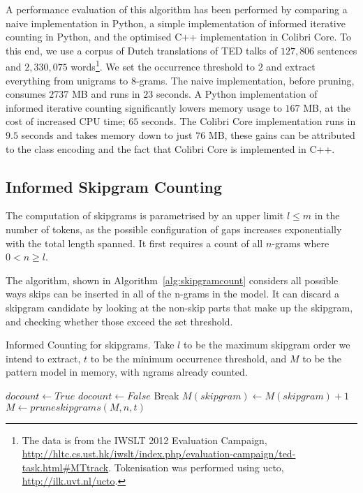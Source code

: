 \documentclass[review]{elsarticle}
\begin{document}
A performance evaluation of this algorithm has been performed by comparing a
naive implementation in Python, a simple implementation of informed iterative
counting in Python, and the optimised C++ implementation in Colibri Core. To
this end, we use a corpus of Dutch translations of TED talks of $127,806$
sentences and $2,330,075$ words\footnote{The data is from the IWSLT 2012
Evaluation Campaign,
\url{http://hltc.cs.ust.hk/iwslt/index.php/evaluation-campaign/ted-task.html\#MTtrack}.
Tokenisation was performed using ucto, \url{http://ilk.uvt.nl/ucto}.}. We set
the occurrence threshold to $2$ and extract everything from unigrams to
$8$-grams. The naive implementation, before pruning, consumes $2737$ MB and
runs in $23$ seconds.  A Python implementation of informed iterative counting
significantly lowers memory usage to $167$ MB, at the cost of increased CPU
time; $65$ seconds. The Colibri Core implementation runs in $9.5$ seconds and
takes memory down to just $76$ MB, these gains can be attributed to the class
encoding and the fact that Colibri Core is implemented in C++.

\subsection{Informed Skipgram Counting}
\label{sec:skipgramcount}

The computation of skipgrams is parametrised by an upper limit $l\leq m$ in the number of
tokens, as the possible configuration of gaps increases exponentially with the
total length spanned. It first requires a count of all $n$-grams where $0<n\geq l$. 

The algorithm, shown in Algorithm~\ref{alg:skipgramcount} considers all
possible ways skips can be inserted in all of the n-grams in the model. It can
discard a skipgram candidate by looking at the non-skip parts that make up the
skipgram, and checking whether those exceed the set threshold. 

\begin{algorithm} \caption{Informed Counting for skipgrams.  Take $l$
to be the maximum skipgram order we intend to extract, $t$ to be the minimum occurrence threshold, and $M$ to be the
pattern model in memory, with ngrams already counted.}
\label{alg:skipgramcount}
\begin{algorithmic}
            \State $docount \leftarrow True$
                    \State $docount \leftarrow False$
                    Break
                \EndIf
            \EndFor 
                \State $M(skipgram) \leftarrow M(skipgram) + 1$
            \EndIf
        \EndFor 
    \EndFor
    \State $M \leftarrow pruneskipgrams(M,n,t)$
\EndFor \\
\end{algorithmic}
\end{algorithm}
\end{document}
